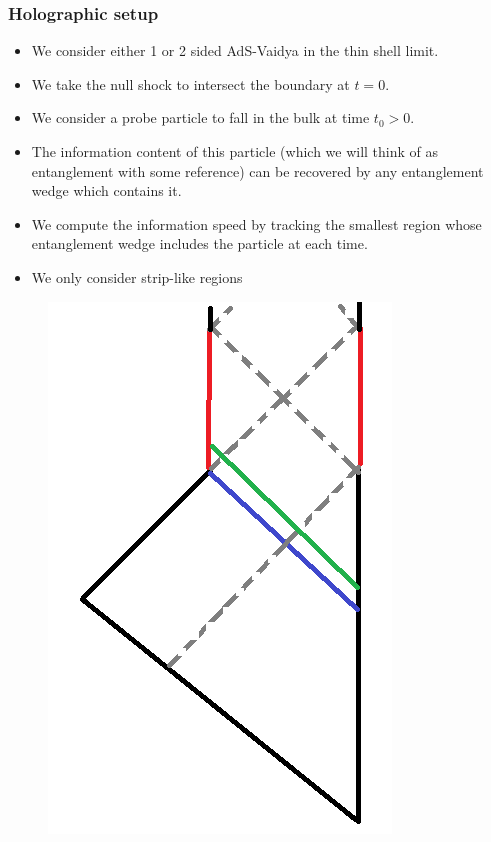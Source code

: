 \documentclass[10pt,aspectratio=169]{beamer}
\begin{document}

\begin{frame}
\frametitle{Holographic setup}

\begin{minipage}[t]{0.44\linewidth}

\begin{itemize}

\item We consider either 1 or 2 sided AdS-Vaidya in the thin shell limit.

\item We take the null shock to intersect the boundary at $t = 0$. 

\item We consider a probe particle to fall in the bulk at time  $t_0>0$.

\item The information content of this particle (which we will think of as entanglement with some reference) can be recovered by any entanglement wedge which contains it.

\item We compute the information speed by tracking the smallest region whose entanglement wedge includes the particle at each time.

\item We only consider strip-like regions

\end{itemize}

\end{minipage}\hfill
%
\begin{minipage}[t]{0.55\linewidth}

\begin{figure}
    \begin{center}
    
        \includegraphics[scale=0.3]{AdSRNVaidyaDiagram}    
    

\end{center}
\end{figure}
\end{minipage}
\end{frame}
\end{document}
